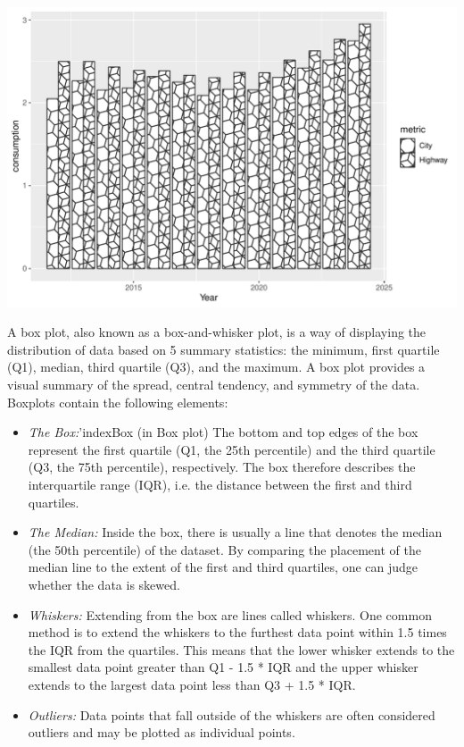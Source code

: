 \begin{center}
  \includegraphics[width=.8\textwidth]{fuel.columnsPatterns.pdf}
\end{center}

A box plot, also known as a box-and-whisker plot, is a way of displaying the distribution of data based on 5 summary statistics: the minimum, first quartile (Q1), median, third quartile (Q3), and the maximum. A box plot provides a visual summary of the spread, central tendency, and symmetry of the data. Boxplots contain the following elements:

\begin{itemize}
\item \emph{The Box:}'index{Box (in Box plot)} The bottom and top edges of the box represent the first quartile (Q1, the 25th percentile) and the third quartile (Q3, the 75th percentile), respectively. The box therefore describes the interquartile range (IQR), i.e. the distance between the first and third quartiles.
\item \emph{The Median:} Inside the box, there is usually a line that denotes the median (the 50th percentile) of the dataset. By comparing the placement of the median line to the extent of the first and third quartiles, one can judge whether the data is skewed.
\item \emph{Whiskers:} Extending from the box are lines called whiskers. One common method is to extend the whiskers to the furthest data point within 1.5 times the IQR from the quartiles. This means that the lower whisker extends to the smallest data point greater than Q1 - 1.5 * IQR and the upper whisker extends to the largest data point less than Q3 + 1.5 * IQR.
\item \emph{Outliers:} Data points that fall outside of the whiskers are often considered outliers and may be plotted as individual points.
\end{itemize}

